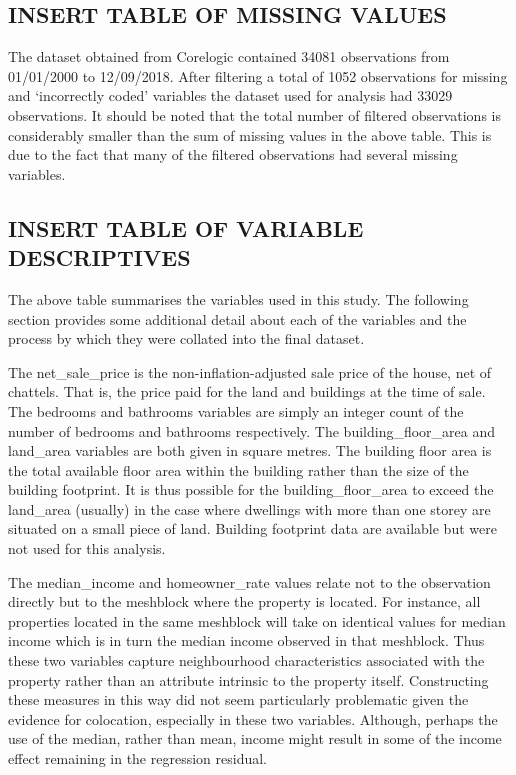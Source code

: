 \documentclass[]{article}
\begin{document}
\subsection{INSERT TABLE OF MISSING
VALUES}\label{insert-table-of-missing-values}

The dataset obtained from Corelogic contained 34081 observations from
01/01/2000 to 12/09/2018. After filtering a total of 1052 observations
for missing and `incorrectly coded' variables the dataset used for
analysis had 33029 observations. It should be noted that the total
number of filtered observations is considerably smaller than the sum of
missing values in the above table. This is due to the fact that many of
the filtered observations had several missing variables.

\subsection{INSERT TABLE OF VARIABLE
DESCRIPTIVES}\label{insert-table-of-variable-descriptives}

The above table summarises the variables used in this study. The
following section provides some additional detail about each of the
variables and the process by which they were collated into the final
dataset.

The net\_sale\_price is the non-inflation-adjusted sale price of the
house, net of chattels. That is, the price paid for the land and
buildings at the time of sale. The bedrooms and bathrooms variables are
simply an integer count of the number of bedrooms and bathrooms
respectively. The building\_floor\_area and land\_area variables are
both given in square metres. The building floor area is the total
available floor area within the building rather than the size of the
building footprint. It is thus possible for the building\_floor\_area to
exceed the land\_area (usually) in the case where dwellings with more
than one storey are situated on a small piece of land. Building
footprint data are available but were not used for this analysis.

The median\_income and homeowner\_rate values relate not to the
observation directly but to the meshblock where the property is located.
For instance, all properties located in the same meshblock will take on
identical values for median income which is in turn the median income
observed in that meshblock. Thus these two variables capture
neighbourhood characteristics associated with the property rather than
an attribute intrinsic to the property itself. Constructing these
measures in this way did not seem particularly problematic given the
evidence for colocation, especially in these two variables. Although,
perhaps the use of the median, rather than mean, income might result in
some of the income effect remaining in the regression residual.
\end{document}
